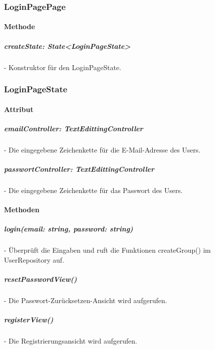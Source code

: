 \documentclass[parskip=full]{scrartcl}
\begin{document}
    \subsubsection{LoginPagePage}
        \paragraph*{Methode}
            \subparagraph*{createState: State<LoginPageState>} - Konstruktor für den LoginPageState.
    
    \subsubsection{LoginPageState}
        \paragraph*{Attribut}
            \subparagraph*{emailController: TextEdittingController} - Die eingegebene Zeichenkette für die E-Mail-Adresse des Users.
            \subparagraph*{passwortController: TextEdittingController} - Die eingegebene Zeichenkette für das Passwort des Users.

        \paragraph*{Methoden}

            \subparagraph*{login(email: string, password: string)} - Überprüft die Eingaben und ruft die Funktionen createGroup() im UserRepository auf.
            \subparagraph*{resetPasswordView()} -  Die Passwort-Zurücksetzen-Ansicht wird aufgerufen.
            \subparagraph*{registerView()} -  Die Registrierungsansicht wird aufgerufen.
\end{document}
